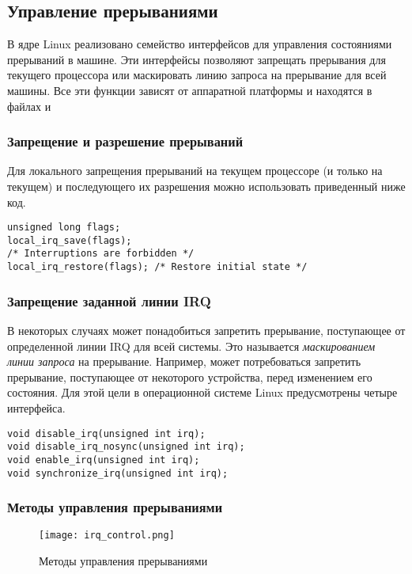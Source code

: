 \subsection{Управление прерываниями}

В ядре Linux реализовано семейство интерфейсов для управления состояниями прерываний в машине. Эти интерфейсы позволяют запрещать прерывания для текущего
процессора или маскировать линию запроса на прерывание для всей машины. Все эти функции зависят от аппаратной платформы и находятся в файлах  и 

\subsubsection{Запрещение и разрешение прерываний}

Для локального запрещения прерываний на текущем процессоре (и только на текущем) и последующего их разрешения можно использовать приведенный ниже код.

\begin{lstlisting}
unsigned long flags;
local_irq_save(flags);
/* Interruptions are forbidden */
local_irq_restore(flags); /* Restore initial state */
\end{lstlisting}

\subsubsection{Запрещение заданной линии IRQ}

В некоторых случаях может понадобиться запретить прерывание, поступающее от определенной линии IRQ для всей системы. Это называется \textit{маскированием линии запроса} на прерывание. Например, может потребоваться запретить прерывание, поступающее от некоторого устройства, перед изменением его состояния. Для этой цели в операционной системе Linux предусмотрены четыре интерфейса.

\begin{lstlisting}
void disable_irq(unsigned int irq);
void disable_irq_nosync(unsigned int irq);
void enable_irq(unsigned int irq);
void synchronize_irq(unsigned int irq);
\end{lstlisting}

\subsubsection{Методы управления прерываниями}

\begin{figure}[h]
\texttt{[image: irq\_control.png]}
\caption{Методы управления прерываниями}
\end{figure}

